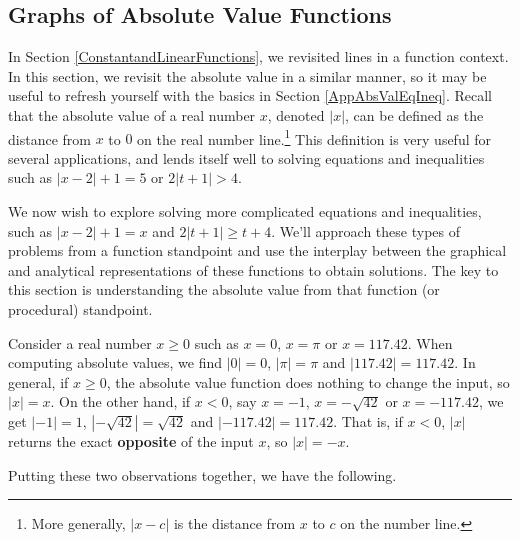 \documentclass{ximera}
\begin{document}
	\author{Stitz-Zeager}




\setcounter{footnote}{0}

\label{AbsoluteValueFunctions}

\subsection{Graphs of Absolute Value Functions}
\label{GraphsofAbsoluteValueFunctions}

In Section \ref{ConstantandLinearFunctions}, we revisited lines in a function context.  In this section, we revisit the absolute value in a similar manner, so it may be useful to refresh yourself with the basics in Section \ref{AppAbsValEqIneq}. Recall that the absolute value of a real number $x$, denoted $|x|$, can be  defined as the distance from $x$ to $0$ on the real number line.\footnote{More generally, $|x - c|$ is the distance from $x$ to $c$ on the number line.}  This definition is very useful for several applications, and lends itself well to solving equations and inequalities such as $|x - 2| + 1 = 5$ or $2|t + 1| > 4$.  

\medskip

We now wish to explore solving more complicated equations and inequalities, such as $|x - 2| + 1 = x$ and $2|t + 1| \geq t + 4$. We'll approach these types of problems from a function standpoint and use the interplay between the graphical and analytical representations of these functions to obtain solutions. The key to this section is understanding the absolute value from that function (or procedural) standpoint. 

\medskip

Consider a real number $x \geq 0$ such as $x = 0$, $x = \pi$ or $x = 117.42$.  When computing absolute values, we find $|0| = 0$, $|\pi| = \pi$ and $|117.42| = 117.42$.  In general,  if $x \geq 0$, the absolute value function does nothing to change the input, so $|x| = x$. On the other hand, if $x < 0$, say $x = -1$, $x = -\sqrt{42}$ or $x = -117.42$, we get $|-1| = 1$, $|-\sqrt{42}| = \sqrt{42}$ and $|-117.42| = 117.42$.  That is, if $x < 0$, $|x|$ returns the exact \textbf{opposite} of the input $x$, so  $|x| = -x$.  

\medskip

Putting these two observations together, we have the following.
\end{document}
